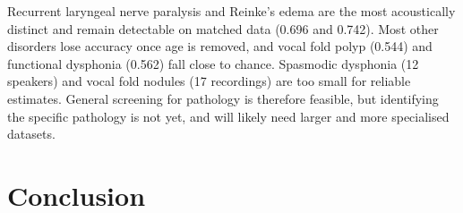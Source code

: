 \documentclass[runningheads]{llncs}
\begin{document}
  \begin{table}[htbp]
  \centering
  \caption{Per-disease binary detection (macro F1, mean $\pm$ SD over five folds). Count of matched pairs per disease in brackets.}
  \label{tab:per_disease}
  \setlength{\tabcolsep}{6pt}
  \end{table}

  Recurrent laryngeal nerve paralysis and Reinke's edema are the most acoustically distinct and remain detectable on matched data (0.696 and 0.742). Most other disorders lose accuracy once age is removed, and vocal fold polyp (0.544) and functional dysphonia (0.562) fall close to chance. Spasmodic dysphonia (12 speakers) and vocal fold nodules (17 recordings) are too small for reliable estimates. General screening for pathology is therefore feasible, but identifying the specific pathology is not yet, and will likely need larger and more specialised datasets.


  \section{Conclusion}
  \label{sec:conclusion}
\end{document}
